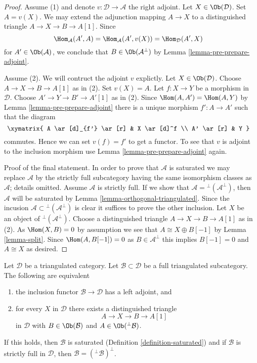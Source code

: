\begin{proof}
Assume (1) and denote $v : \mathcal{D} \to \mathcal{A}$ the right adjoint.
Let $X \in \Ob(\mathcal{D})$. Set $A = v(X)$. We may extend the
adjunction mapping $A \to X$ to a distinguished triangle
$A \to X \to B \to A[1]$. Since
$$
\Hom_\mathcal{A}(A', A) =
\Hom_\mathcal{A}(A', v(X)) =
\Hom_\mathcal{D}(A', X)
$$
for $A' \in \Ob(\mathcal{A})$, we conclude that $B \in \Ob(\mathcal{A}^\perp)$
by Lemma \ref{lemma-pre-prepare-adjoint}.

\medskip\noindent
Assume (2). We will contruct the adjoint $v$ explictly.
Let $X \in \Ob(\mathcal{D})$. Choose $A \to X \to B \to A[1]$ as in (2).
Set $v(X) = A$. Let $f : X \to Y$ be a morphism in $\mathcal{D}$.
Choose $A' \to Y \to B' \to A'[1]$ as in (2). Since
$\Hom(A, A') = \Hom(A, Y)$ by Lemma \ref{lemma-pre-prepare-adjoint}
there is a unique morphism $f' : A \to A'$ such that the diagram
$$
\xymatrix{
A \ar[d]_{f'} \ar[r] & X \ar[d]^f \\
A' \ar[r] & Y
}
$$
commutes. Hence we can set $v(f) = f'$ to get a functor.
To see that $v$ is adjoint to the inclusion morphism use
Lemma \ref{lemma-pre-prepare-adjoint} again.

\medskip\noindent
Proof of the final statement. In order to prove that $\mathcal{A}$
is saturated we may replace $\mathcal{A}$ by the strictly full
subcategory having the same isomorphism classes as $\mathcal{A}$;
details omitted. Assume $\mathcal{A}$ is strictly full. If we show that
$\mathcal{A} = {}^\perp(\mathcal{A}^\perp)$, then
$\mathcal{A}$ will be saturated by Lemma \ref{lemma-orthogonal-triangulated}.
Since the incusion $\mathcal{A} \subset {}^\perp(\mathcal{A}^\perp)$
is clear it suffices to prove the other inclusion.
Let $X$ be an object of ${}^\perp(\mathcal{A}^\perp)$.
Choose a distinguished triangle $A \to X \to B \to A[1]$
as in (2). As $\Hom(X, B) = 0$ by assumption we see that
$A \cong X \oplus B[-1]$ by Lemma \ref{lemma-split}.
Since $\Hom(A, B[-1]) = 0$ as $B \in \mathcal{A}^\perp$
this implies $B[-1] = 0$ and $A \cong X$ as desired.
\end{proof}

\begin{lemma}
\label{lemma-left-adjoint}
Let $\mathcal{D}$ be a triangulated category. Let
$\mathcal{B} \subset \mathcal{D}$ be a full triangulated subcategory.
The following are equivalent
\begin{enumerate}
\item the inclusion functor $\mathcal{B} \to \mathcal{D}$
has a left adjoint, and
\item for every $X$ in $\mathcal{D}$ there exists a distinguished
triangle
$$
A \to X \to B \to A[1]
$$
in $\mathcal{D}$ with $B \in \Ob(\mathcal{B})$ and
$A \in \Ob({}^\perp\mathcal{B})$.
\end{enumerate}
If this holds, then $\mathcal{B}$ is saturated
(Definition \ref{definition-saturated}) and if $\mathcal{B}$
is strictly full in $\mathcal{D}$, then
$\mathcal{B} = ({}^\perp\mathcal{B})^\perp$.
\end{lemma}

